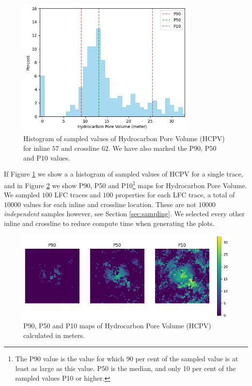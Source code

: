 \documentclass[note,screen,english,12pt,utf8]{nrdoc}
\begin{document}
\begin{figure}[h]
    \centering
    \includegraphics[width=0.8\textwidth]{figures/hydrocarbon_pore_volume_meters_il57_xl62.png}
    \caption{
        Histogram of sampled values of Hydrocarbon Pore Volume (HCPV) for inline $57$ and crossline $62$.
        We have also marked the P90, P50 and P10 values.
    }
    \label{fig:hydrocarbon_pore_volume}
\end{figure}


If Figure \ref{fig:hydrocarbon_pore_volume} we show a a histogram of sampled values of
HCPV for a single trace, and in Figure \ref{fig:hydrocarbon_pore_volume_maps} we show
P90, P50 and P10\footnote{The P90 value is the value for which 90 per cent of the
sampled value is at least as large as this value. P50 is the median, and only 10 per cent of the sampled values P10 or higher.} maps for
Hydrocarbon Pore Volume. We sampled $100$ LFC traces and $100$ properties for each
LFC trace, a total of $10000$ values for each inline and crossline location.
These are not $10000$ \textit{independent} samples however, see Section \ref{sec:sampling}.
We selected every other inline and
crossline to reduce compute time when generating the plots.

\begin{figure}[h]
    \centering
    \includegraphics[width=\textwidth]{figures/hydrocarbon_pore_volume_meter_p90_p50_p10.png}
    \caption{P90, P50 and P10 maps of Hydrocarbon Pore Volume (HCPV) calculated in meters.}
    \label{fig:hydrocarbon_pore_volume_maps}
\end{figure}
\end{document}
